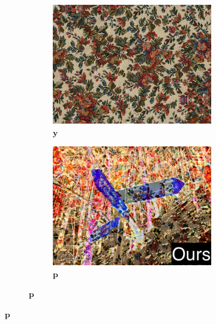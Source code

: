 \begin{figure}[ht]
    \centering    
    \begin{subfigure}{\textwidth}
        \centering
        \begin{subfigure}{0.3\textwidth}
            \centering
            \includegraphics[width=\textwidth]{images/01-results_teaser-target.jpg}
            \caption{\(\bm{y}\)}
            \label{fig:intro_results_teaser_target}
        \end{subfigure}
        \hfill
        \begin{subfigure}{0.3\textwidth}
            \centering
            \includegraphics[width=\textwidth]{images/01-results_teaser-stats_opt_label.jpg}
            \caption{\(\bm{p}\)}

\end{subfigure}
\end{subfigure}
\end{figure}
